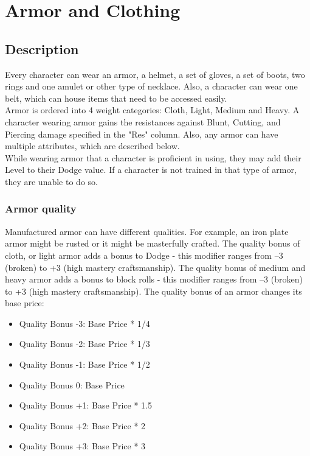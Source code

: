 \chapter{Armor and Clothing}\label{ch:armor}
\section{Description}\label{armorDescription}
Every character can wear an armor, a helmet, a set of gloves, a set of boots, two rings and one amulet or other type of necklace.
Also, a character can wear one belt, which can house items that need to be accessed easily.\\
Armor is ordered into 4 weight categories: Cloth, Light, Medium and Heavy.
A character wearing armor gains the resistances against Blunt, Cutting, and Piercing damage specified in the "Res" column.
Also, any armor can have multiple attributes, which are described below.\\
While wearing armor that a character is proficient in using, they may add their Level to their Dodge value.
If a character is not trained in that type of armor, they are unable to do so.
\subsection{Armor quality}\label{subsec:armorQuality}
Manufactured armor can have different qualities.
For example, an iron plate armor might be rusted or it might be masterfully crafted.
The quality bonus of cloth, or light armor adds a bonus to Dodge - this modifier ranges from --3 (broken) to +3 (high mastery craftsmanship).
The quality bonus of medium and heavy armor adds a bonus to block rolls - this modifier ranges from --3 (broken) to +3 (high mastery craftsmanship).
The quality bonus of an armor changes its base price:\\

\begin{itemize}
    \item Quality Bonus -3: Base Price * 1/4
    \item Quality Bonus -2: Base Price * 1/3
    \item Quality Bonus -1: Base Price * 1/2
    \item Quality Bonus 0: Base Price
    \item Quality Bonus +1: Base Price * 1.5
    \item Quality Bonus +2: Base Price * 2
    \item Quality Bonus +3: Base Price * 3
\end{itemize}


